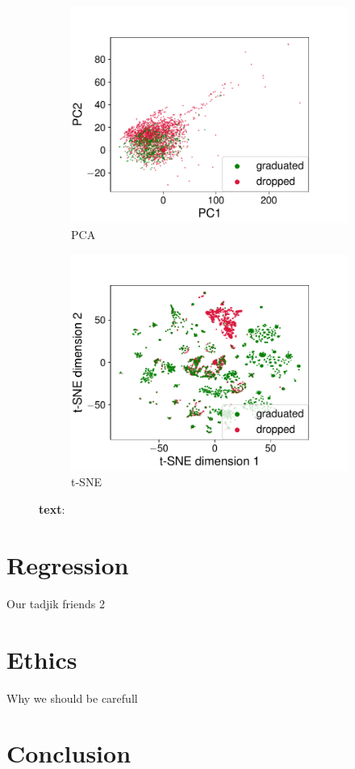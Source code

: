 \documentclass{article}
\begin{document}
\begin{figure}[h]
  \centering 
  \begin{subfigure}{0.49\textwidth}
    \includegraphics[width=\linewidth]{../gfx/pca.pdf}
    \caption{PCA}
    \label{fig:pca}
  \end{subfigure} 
  \begin{subfigure}{0.49\textwidth}
    \includegraphics[width=\linewidth]{../gfx/tsne.pdf}
    \caption{t-SNE}
    \label{fig:tsne}
  \end{subfigure}
  \caption{\textbf{text}: }
\end{figure}

\section{Regression}
Our tadjik friends 2

\section{Ethics}
Why we should be carefull

\section{Conclusion}
\end{document}
